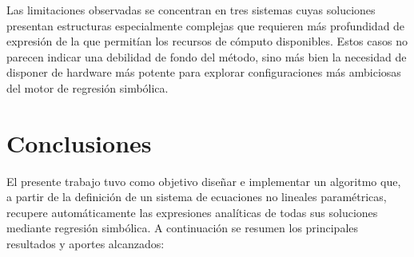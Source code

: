 \documentclass[12pt,a4paper]{article} \usepackage[utf8]{inputenc} \usepackage[spanish]{babel} \usepackage{amsmath, amssymb, amsthm} \usepackage{bm} \usepackage{float} \usepackage{longtable} \usepackage[hidelinks]{hyperref}
\begin{document}
Las limitaciones observadas se concentran en tres sistemas cuyas soluciones presentan estructuras especialmente complejas que requieren más profundidad de expresión de la que permitían los recursos de cómputo disponibles. Estos casos no parecen indicar una debilidad de fondo del método, sino más bien la necesidad de disponer de hardware más potente para explorar configuraciones más ambiciosas del motor de regresión simbólica. \newpage

\section{Conclusiones}
\label{sec:conclusiones}

El presente trabajo tuvo como objetivo diseñar e implementar un algoritmo que, a partir de la definición de un sistema de ecuaciones no lineales paramétricas, recupere automáticamente las expresiones analíticas de todas sus soluciones mediante regresión simbólica. A continuación se resumen los principales resultados y aportes alcanzados:
\end{document}
